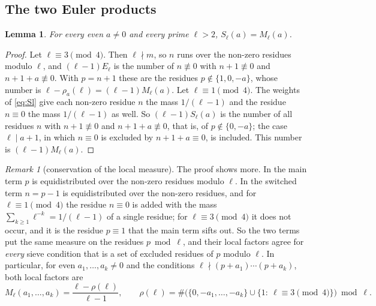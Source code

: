\documentclass[11pt,a4paper]{amsart}
\newtheorem{lemma}[theorem]{Lemma}
\theoremstyle{remark}
\newtheorem{remark}[theorem]{Remark}
\numberwithin{equation}{section}
\begin{document}
\subsection{The two Euler products}
\begin{lemma}\label{lem:local}
For every even $a\ne0$ and every prime $\ell>2$, $S_\ell(a)=M_\ell(a)$.
\end{lemma}
\begin{proof}
Let $\ell\equiv3\pmod 4$. Then $\ell\nmid m$, so $n$ runs over the non-zero residues modulo $\ell$, and
$(\ell-1)E_\ell$ is the number of $n\not\equiv0$ with $n+1\not\equiv0$ and $n+1+a\not\equiv0$. With $p=n+1$ these are
the residues $p\notin\{1,0,-a\}$, whose number is $\ell-\rho_a(\ell)=(\ell-1)M_\ell(a)$. Let $\ell\equiv1\pmod4$.
The weights of \eqref{eq:Sl} give each non-zero residue $n$ the mass $1/(\ell-1)$ and the residue $n\equiv0$ the
mass $1/(\ell-1)$ as well. So $(\ell-1)S_\ell(a)$ is the number of all residues $n$ with $n+1\not\equiv0$ and
$n+1+a\not\equiv0$, that is, of $p\notin\{0,-a\}$; the case $\ell\mid a+1$, in which $n\equiv0$ is excluded by
$n+1+a\equiv0$, is included. This number is $(\ell-1)M_\ell(a)$.
\end{proof}

\begin{remark}[conservation of the local measure]\label{rem:measure}
The proof shows more. In the main term $p$ is equidistributed over the non-zero residues modulo $\ell$. In the
switched term $n=p-1$ is equidistributed over the non-zero residues, and for $\ell\equiv1\pmod 4$ the residue
$n\equiv0$ is added with the mass $\sum_{k\ge1}\ell^{-k}=1/(\ell-1)$ of a single residue; for $\ell\equiv3\pmod 4$
it does not occur, and it is the residue $p\equiv1$ that the main term sifts out. So the two terms put the same
measure on the residues $p\bmod\ell$, and their local factors agree for \emph{every} sieve condition that is a
set of excluded residues of $p$ modulo $\ell$. In particular, for even $a_1,\dots,a_k\ne0$ and the conditions
$\ell\nmid(p+a_1)\cdots(p+a_k)$, both local factors are
\begin{equation}\label{eq:Mtuple}
M_\ell(a_1,\dots,a_k)=\frac{\ell-\rho(\ell)}{\ell-1},\qquad
\rho(\ell)=\#\bigl(\{0,-a_1,\dots,-a_k\}\cup\{1:\ \ell\equiv3\!\!\!\pmod 4\}\bigr)\bmod\ell .
\end{equation}
\end{remark}
\end{document}
